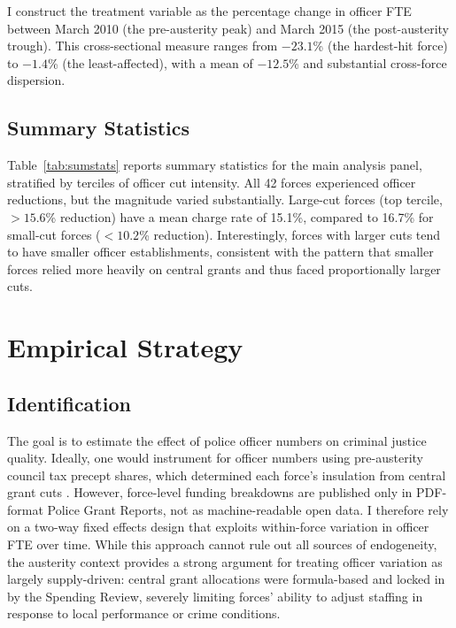 \documentclass[12pt]{article}
\begin{document}
I construct the treatment variable as the percentage change in officer FTE between March 2010 (the pre-austerity peak) and March 2015 (the post-austerity trough). This cross-sectional measure ranges from $-23.1$\% (the hardest-hit force) to $-1.4$\% (the least-affected), with a mean of $-12.5$\% and substantial cross-force dispersion.

\subsection{Summary Statistics}



Table~\ref{tab:sumstats} reports summary statistics for the main analysis panel, stratified by terciles of officer cut intensity. All 42 forces experienced officer reductions, but the magnitude varied substantially. Large-cut forces (top tercile, $> 15.6$\% reduction) have a mean charge rate of 15.1\%, compared to 16.7\% for small-cut forces ($< 10.2$\% reduction). Interestingly, forces with larger cuts tend to have smaller officer establishments, consistent with the pattern that smaller forces relied more heavily on central grants and thus faced proportionally larger cuts.


\section{Empirical Strategy}

\subsection{Identification}

The goal is to estimate the effect of police officer numbers on criminal justice quality. Ideally, one would instrument for officer numbers using pre-austerity council tax precept shares, which determined each force's insulation from central grant cuts \citep{nao2018}. However, force-level funding breakdowns are published only in PDF-format Police Grant Reports, not as machine-readable open data. I therefore rely on a two-way fixed effects design that exploits within-force variation in officer FTE over time. While this approach cannot rule out all sources of endogeneity, the austerity context provides a strong argument for treating officer variation as largely supply-driven: central grant allocations were formula-based and locked in by the Spending Review, severely limiting forces' ability to adjust staffing in response to local performance or crime conditions.
\end{document}
